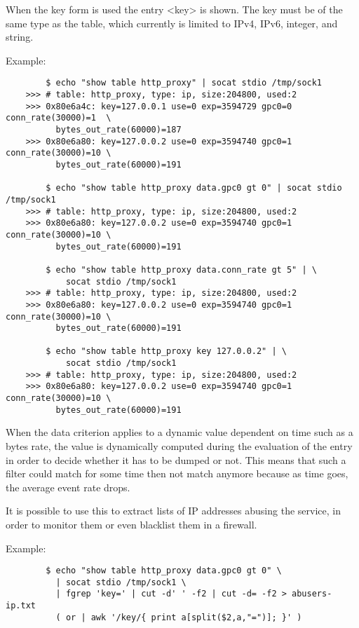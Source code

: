   When the key form is used the entry <key> is shown.  The key must be of the
  same type as the table, which currently is limited to IPv4, IPv6, integer,
  and string.

  Example:
  \begin{verbatim}
        $ echo "show table http_proxy" | socat stdio /tmp/sock1
    >>> # table: http_proxy, type: ip, size:204800, used:2
    >>> 0x80e6a4c: key=127.0.0.1 use=0 exp=3594729 gpc0=0 conn_rate(30000)=1  \
          bytes_out_rate(60000)=187
    >>> 0x80e6a80: key=127.0.0.2 use=0 exp=3594740 gpc0=1 conn_rate(30000)=10 \
          bytes_out_rate(60000)=191

        $ echo "show table http_proxy data.gpc0 gt 0" | socat stdio /tmp/sock1
    >>> # table: http_proxy, type: ip, size:204800, used:2
    >>> 0x80e6a80: key=127.0.0.2 use=0 exp=3594740 gpc0=1 conn_rate(30000)=10 \
          bytes_out_rate(60000)=191

        $ echo "show table http_proxy data.conn_rate gt 5" | \
            socat stdio /tmp/sock1
    >>> # table: http_proxy, type: ip, size:204800, used:2
    >>> 0x80e6a80: key=127.0.0.2 use=0 exp=3594740 gpc0=1 conn_rate(30000)=10 \
          bytes_out_rate(60000)=191

        $ echo "show table http_proxy key 127.0.0.2" | \
            socat stdio /tmp/sock1
    >>> # table: http_proxy, type: ip, size:204800, used:2
    >>> 0x80e6a80: key=127.0.0.2 use=0 exp=3594740 gpc0=1 conn_rate(30000)=10 \
          bytes_out_rate(60000)=191
  \end{verbatim}

  When the data criterion applies to a dynamic value dependent on time such as
  a bytes rate, the value is dynamically computed during the evaluation of the
  entry in order to decide whether it has to be dumped or not. This means that
  such a filter could match for some time then not match anymore because as
  time goes, the average event rate drops.

  It is possible to use this to extract lists of IP addresses abusing the
  service, in order to monitor them or even blacklist them in a firewall.

  Example:
  \begin{verbatim}
        $ echo "show table http_proxy data.gpc0 gt 0" \
          | socat stdio /tmp/sock1 \
          | fgrep 'key=' | cut -d' ' -f2 | cut -d= -f2 > abusers-ip.txt
          ( or | awk '/key/{ print a[split($2,a,"=")]; }' )
  \end{verbatim}

